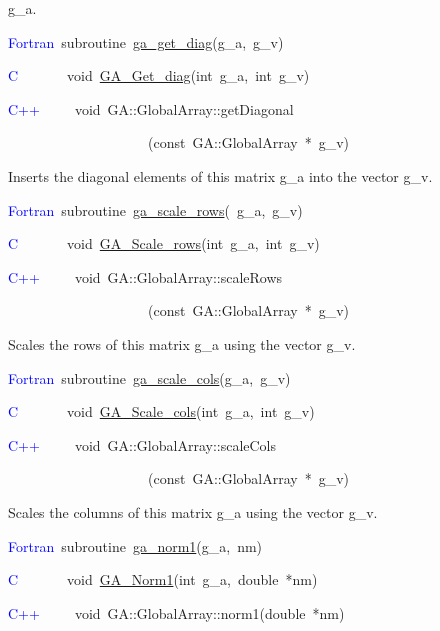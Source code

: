 g\_a. 
\begin{lyxcode}
\textcolor{blue}{Fortran}~subroutine~\href{http://www.emsl.pnl.gov/docs/global/ga_ops.html\#ga_get_diag}{ga\_{}get\_{}diag}(g\_a,~g\_v)~

\textcolor{blue}{C}~~~~~~~void~\href{http://www.emsl.pnl.gov/docs/global/c_nga_ops.html\#ga_get_diag}{GA\_{}Get\_{}diag}(int~g\_a,~int~g\_v)

\textcolor{blue}{C++~}~~~~void~GA::GlobalArray::getDiagonal

~~~~~~~~~~~~~~~~~~~~(const~GA::GlobalArray~{*}~g\_v)
\end{lyxcode}
Inserts the diagonal elements of this matrix g\_a into the vector
g\_v. 
\begin{lyxcode}
\textcolor{blue}{Fortran}~subroutine~\href{http://www.emsl.pnl.gov/docs/global/ga_ops.html\#ga_scale_rows}{ga\_{}scale\_{}rows}(~g\_a,~g\_v)

\textcolor{blue}{C}~~~~~~~void~\href{http://www.emsl.pnl.gov/docs/global/c_nga_ops.html\#ga_scale_rows}{GA\_{}Scale\_{}rows}(int~g\_a,~int~g\_v)~

\textcolor{blue}{C++}~~~~~void~GA::GlobalArray::scaleRows

~~~~~~~~~~~~~~~~~~~~(const~GA::GlobalArray~{*}~g\_v)
\end{lyxcode}
Scales the rows of this matrix g\_a using the vector g\_v. 
\begin{lyxcode}
\textcolor{blue}{Fortran}~subroutine~\href{http://www.emsl.pnl.gov/docs/global/ga_ops.html\#ga_scale_cols}{ga\_{}scale\_{}cols}(g\_a,~g\_v)~

\textcolor{blue}{C}~~~~~~~void~\href{http://www.emsl.pnl.gov/docs/global/c_nga_ops.html\#ga_scale_cols}{GA\_{}Scale\_{}cols}(int~g\_a,~int~g\_v)~

\textcolor{blue}{C++}~~~~~void~GA::GlobalArray::scaleCols

~~~~~~~~~~~~~~~~~~~~(const~GA::GlobalArray~{*}~g\_v)
\end{lyxcode}
Scales the columns of this matrix g\_a using the vector g\_v. 
\begin{lyxcode}
\textcolor{blue}{Fortran}~subroutine~\href{http://www.emsl.pnl.gov/docs/global/ga_ops.html\#ga_norm1}{ga\_{}norm1}(g\_a,~nm)

\textcolor{blue}{C}~~~~~~~void~\href{http://www.emsl.pnl.gov/docs/global/c_nga_ops.html\#ga_norm1}{GA\_{}Norm1}(int~g\_a,~double~{*}nm)

\textcolor{blue}{C++}~~~~~void~GA::GlobalArray::norm1(double~{*}nm)
\end{lyxcode}
